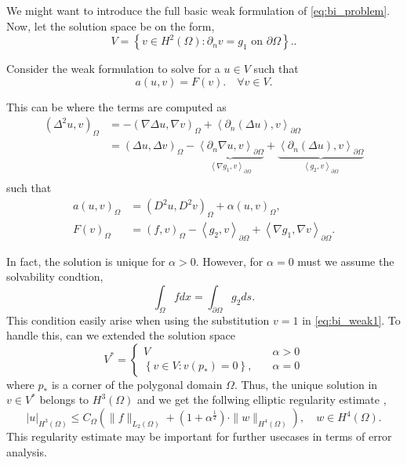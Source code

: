 We might want to introduce the full basic weak formulation of \eqref{eq:bi_problem}. Now, let the solution space be on the form,
\begin{equation*}
V = \left\{ v \in H^2\left( \Omega  \right) : \partial _{n} v = g_{1}  \text{ on }
\partial \Omega  \right\}.
.\end{equation*}

Consider the weak formulation to solve for a $u \in  V$ such that
\begin{equation}
    \label{eq:bi_weak1}
a\left( u,v \right) = F(v).\quad \forall v \in
V.
\end{equation}


This can be
where the terms are computed as
\[
    \begin{split}
\left( \Delta ^2 u, v \right) _{\Omega } & = - \left( \nabla  \Delta  u , \nabla v   \right)_{\Omega } + \left<\partial _{n} ( \Delta u ),  v \right>_{\partial \Omega } \\
&= \left( \Delta u, \Delta v \right)_{\Omega } - \underbrace{\left< \partial _{n} \nabla u,v  \right>_{\partial \Omega }}_{\left< \nabla g_{1},v \right> _{\partial \Omega } }  +  \underbrace{\left<\partial _{n} ( \Delta u ) ,  v \right>_{\partial \Omega }} _{\left<g_2 ,v \right>_{\partial \Omega } } \\
    \end{split}
\]
such that
\[
    \begin{split}
a\left( u,v \right)_{\Omega } & =    \left( D ^2 u , D ^2 v\right)_{\Omega }  +
\alpha \left( u, v \right)_{\Omega }  , \\
F\left( v \right)_{\Omega } & = \left( f,v \right)_{\Omega } - \left<g_{2},v \right>_{\partial \Omega } + \left<\nabla g_{1}, \nabla v \right>_{\partial \Omega }.
    \end{split}
\]

 In fact, the solution is unique for $\alpha  > 0$. However, for $\alpha  = 0$ must we assume the solvability condtion,
\begin{equation*}
 \int_{\Omega }^{} f dx = \int_{\partial \Omega }^{} g_{2} ds
.\end{equation*}
This condition easily arise when using the substitution $v=1$ in \eqref{eq:bi_weak1}. To handle this, can we extended the solution space \[
V^{*} = \begin{cases}
    V \quad & \alpha  > 0 \\
    \left\{ v \in V: v\left( p_{*} \right)  = 0\right\}, \quad & \alpha  = 0
\end{cases}
\]
where $p_{*}$ is a corner of the polygonal domain $\Omega $.
Thus, the unique solution in $v \in V^{*}$ belongs to $H^{3 }\left( \Omega  \right) $ and we get the follwing
elliptic regularity estimate \cite{gu2012c0},
\begin{equation}
\label{eq:bi_harmonic_ellitpic_regularity}
\left| u \right| _{H^{3 }\left( \Omega  \right) }  \le C_{\Omega } \left( \| f \|_{  L_{2}( \Omega ) }^{  } + ( 1 + \alpha  ^{\frac{1}{2}}
) \cdot \| w  \|_{ H^{4}\left( \Omega  \right)  }^{  }    \right), \quad w\in H^{4}\left( \Omega  \right).
\end{equation}
This regularity estimate may be important for further usecases in terms of error analysis.

